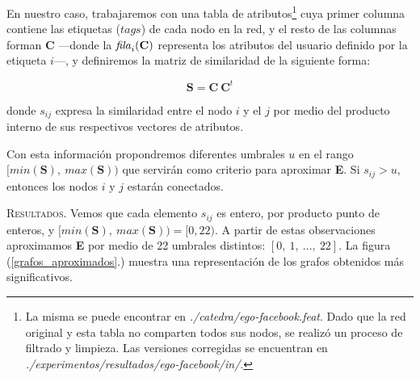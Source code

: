 
\vspace{2em}
En nuestro caso, trabajaremos con una tabla de atributos\footnote{La misma se puede encontrar en \textit{./catedra/ego-facebook.feat}. Dado que la red original y esta tabla no comparten todos sus nodos, se realizó un proceso de filtrado y limpieza. Las versiones corregidas se encuentran en \textit{./experimentos/resultados/ego-facebook/in/}.} cuya primer columna contiene las etiquetas ($tags$) de cada nodo en la red, y el resto de las columnas forman \textbf{C} ---donde la $\text{\textit{fila}}_i(\textbf{C})$ representa los atributos del usuario definido por la etiqueta $i$---, y definiremos la matriz de similaridad de la siguiente forma:

\vspace{1em}
\begin{equation}
    \mathbf{S} = \mathbf{C}\ \mathbf{C}^{t}
\end{equation}

\vspace{1em}
\noindent donde $s_{ij}$ expresa la similaridad entre el nodo $i$ y el $j$ por medio del producto interno de sus respectivos vectores de atributos. 

\vspace{1em}
Con esta información propondremos diferentes umbrales $u$ en el rango $[min(\mathbf{S}),\ max(\mathbf{S}))$ que servirán como criterio para aproximar \textbf{E}. Si $s_{ij} > u$, entonces los nodos $i$ y $j$ estarán conectados. 


\vspace{2em}
\noindent \textsc{Resultados}. Vemos que cada elemento $s_{ij}$ es entero, por producto punto de enteros, y $[min(\mathbf{S}),\ max(\mathbf{S})) = [0, 22)$. A partir de estas observaciones aproximamos \textbf{E} por medio de 22 umbrales distintos: $[0,\ 1,\ ...,\ 22]$. La figura (\ref{grafos_aproximados}.) muestra una representación de los grafos obtenidos más significativos. 

